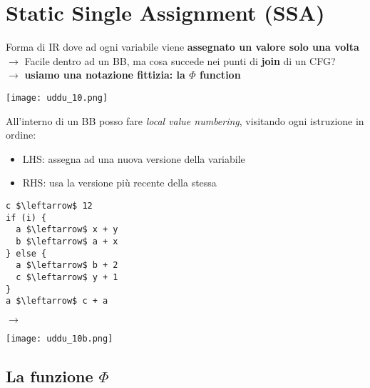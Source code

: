 \section{Static Single Assignment (SSA)}

\noindent\begin{minipage}[t]{.4\textwidth}
  \vspace{.5em}
  Forma di IR dove ad ogni variabile viene \textbf{assegnato un valore solo una volta}\\ $\rightarrow$ Facile dentro ad un BB, ma cosa succede nei punti di \textbf{join} di un CFG?\\
  $\rightarrow$ \textbf{usiamo una notazione fittizia: la $\Phi$ function}
\end{minipage}\hfill
\begin{minipage}[t]{.58\textwidth}
  \begin{example}[frametitle={Local value numbering}]
    \begin{center}
      \texttt{[image: uddu\_10.png]}
    \end{center}

    All'interno di un BB posso fare \textit{local value numbering}, visitando ogni istruzione in ordine:
    \begin{itemize}
      \item LHS: assegna ad una nuova versione della variabile
      \item RHS: usa la versione pi\`u recente della stessa
    \end{itemize}

  \end{example}
\end{minipage}

\noindent\begin{minipage}[c]{.4\textwidth}
  \begin{lstlisting}
c $\leftarrow$ 12
if (i) {
  a $\leftarrow$ x + y
  b $\leftarrow$ a + x
} else {
  a $\leftarrow$ b + 2
  c $\leftarrow$ y + 1
}
a $\leftarrow$ c + a\end{lstlisting}
\end{minipage} \hfill $\rightarrow$ \hfill
\begin{minipage}[c]{.35\textwidth}
  \texttt{[image: uddu\_10b.png]}
\end{minipage}

\subsection{La funzione $\Phi$}

